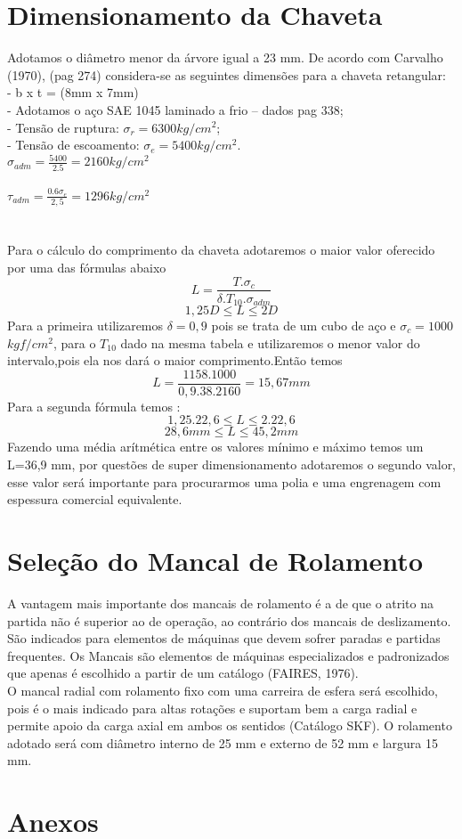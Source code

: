 \documentclass[11pt,a4paper]{report}
\begin{document}
\chapter{Dimensionamento da Chaveta}
Adotamos o di\^ametro menor da \'arvore igual a 23 mm.
De acordo com Carvalho (1970), (pag 274) considera-se as seguintes
dimens\~oes para a chaveta retangular:\\
- b x t = (8mm x 7mm)\\
- Adotamos o a\c{c}o SAE 1045 laminado a frio – dados pag 338;\\
- Tens\~ao de ruptura: $\sigma_r = 6300 kg/cm^2$;\\
- Tens\~ao de escoamento: $\sigma_e = 5400 kg/cm^2.$\\
$\sigma_{adm}=\frac{5400}{2.5}=2160kg/cm^2$\\\\
$\tau_{adm}=\frac{0.6\sigma_e}{2,5} = 1296 kg/cm^2$\\\\
\\
Para o c\'alculo do comprimento da chaveta adotaremos o maior valor oferecido por uma das f\'ormulas abaixo\\
$$L=\frac{T.\sigma_c}{\delta.T_{10}.\sigma_{adm}}$$
$$1,25D \le L \le 2D$$
Para a primeira utilizaremos $\delta =0,9$ pois se trata de um cubo de a\c{c}o e $\sigma_c=1000$ $ kgf/cm^2$, para o $T_{10}$ dado na mesma tabela e utilizaremos o menor valor do intervalo,pois ela nos dar\'a o maior comprimento.Ent\~ao temos
$$L=\frac{1158.1000}{0,9.38.2160}=15,67mm$$
Para a segunda f\'ormula temos :
$$1,25.22,6\le L \le 2.22,6$$
$$28,6mm\le L \le 45,2 mm$$
Fazendo uma m\'edia ar\'itm\'etica entre os valores m\'inimo e m\'aximo temos um L=36,9 mm, por quest\~oes de super dimensionamento adotaremos o segundo valor, esse valor ser\'a importante para procurarmos uma polia e uma engrenagem  com espessura comercial equivalente. \\
\chapter{Sele\c{c}\~ao do Mancal de Rolamento}
A vantagem mais importante dos mancais de rolamento \'e a de que o
atrito na partida não \'e superior ao de opera\c{c}\~ao, ao contr\'ario dos mancais de
deslizamento. São indicados para elementos de m\'aquinas que devem sofrer
paradas e partidas frequentes. Os Mancais s\~ao elementos de m\'aquinas
especializados e padronizados que apenas \'e escolhido a partir de um cat\'alogo
(FAIRES, 1976).\\
O mancal radial com rolamento fixo com uma carreira de esfera ser\'a
escolhido, pois \'e o mais indicado para altas rota\c{c}\~oes e suportam bem a carga
radial e permite apoio da carga axial em ambos os sentidos (Cat\'alogo SKF). O
rolamento adotado ser\'a com di\^ametro interno de 25 mm e externo de 52 mm e largura 15 mm.
\newpage
\chapter{Anexos}
\end{document}
